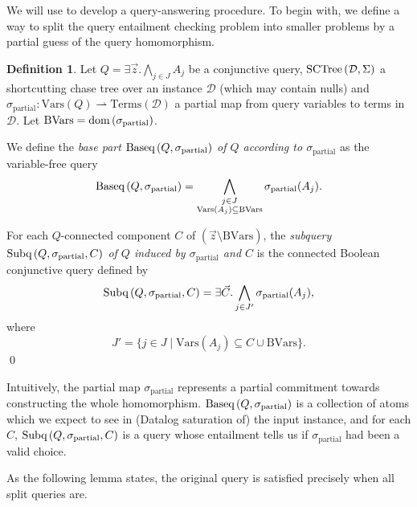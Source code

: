 \documentclass[12pt]{report}
\theoremstyle{plain}
\theoremstyle{definition}
\newtheorem{definition}[theorem]{Definition}
\def\Vars{{\mathrm{Vars}}}
\def\Terms{{\mathrm{Terms}}}
\newcommand{\dom}[1]{\ensuremath{\normalfont{\operatorname{dom}} \left( #1 \right)}}
\newcommand{\SCTree}[2]{\ensuremath{\normalfont{\textrm{SCTree}} \left( #1, #2 \right)}}
\newcommand{\Subq}[3]{\ensuremath{\normalfont{\textrm{Subq}} \left( #1, #2, #3 \right)}}
\newcommand{\Baseq}[2]{\ensuremath{\normalfont{\textrm{Baseq}} \left( #1, #2 \right)}}
\begin{document}
We will use  to develop a query-answering procedure. To begin with, we define a way to split the query entailment checking problem into smaller problems by a partial guess of the query homomorphism.


\begin{definition}
  Let $Q = \exists \vec{z}. \bigwedge_{j \in J} A_j$ be a conjunctive query, $\SCTree{\mathcal{D}}{\Sigma}$ a shortcutting chase tree over an instance $\mathcal{D}$ (which may contain nulls) and $\sigma_\mathrm{partial}: \Vars(Q) \rightharpoonup \Terms(\mathcal{D})$ a partial map from query variables to terms in $\mathcal{D}$. Let $\mathrm{BVars} = \dom{\sigma_\mathrm{partial}}$.

  We define the \emph{base part $\Baseq{Q}{\sigma_\mathrm{partial}}$ of $Q$ according to $\sigma_\mathrm{partial}$} as the variable-free query
  $$\Baseq{Q}{\sigma_\mathrm{partial}} = \bigwedge_{\substack{j \in J \\ \Vars(A_j) \subseteq \mathrm{BVars}}} \sigma_\mathrm{partial}(A_j).$$

  For each $Q$-connected component $C$ of $(\vec{z} \setminus \mathrm{BVars})$, the \emph{subquery $\Subq{Q}{\sigma_\mathrm{partial}}{C}$ of $Q$ induced by $\sigma_\mathrm{partial}$ and $C$} is the connected Boolean conjunctive query defined by
  $$\Subq{Q}{\sigma_\mathrm{partial}}{C} = \exists \vec{C}. \bigwedge_{j \in J'} \sigma_\mathrm{partial}(A_j),$$
  where $$J' = \{ j \in J \mid \Vars(A_j) \subseteq C \cup \mathrm{BVars} \}.$$
  \qed
\end{definition}

Intuitively, the partial map $\sigma_\mathrm{partial}$ represents a partial commitment towards constructing the whole homomorphism. $\Baseq{Q}{\sigma_\mathrm{partial}}$ is a collection of atoms which we expect to see in (Datalog saturation of) the input instance, and for each $C$, $\Subq{Q}{\sigma_\mathrm{partial}}{C}$ is a query whose entailment tells us if $\sigma_\mathrm{partial}$ had been a valid choice.

As the following lemma states, the original query is satisfied precisely when all split queries are.
\end{document}

